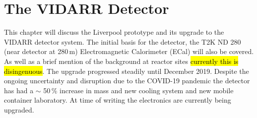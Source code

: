 
\ifpdf
    \graphicspath{{Chapter3/Figs/Raster/}{Chapter3/Figs/PDF/}{Chapter3/Figs/}}
\else
    \graphicspath{{Chapter3/Figs/Vector/}{Chapter3/Figs/}}
\fi


\chapter{The VIDARR Detector}\label{Chp:ThePrototypeDetector}
This chapter will discuss the Liverpool prototype and its upgrade to the VIDARR detector system. The initial basis for the detector, the T2K ND 280 (near detector at 280\,m) Electromagnetic Calorimeter (ECal) will also be covered. As well as a brief mention of the background at reactor sites \hl{currently this is disingenuous}. The upgrade progressed steadily until December 2019. Despite the ongoing uncertainty and disruption due to the COVID-19 pandemic the detector has had a $\sim$ 50\,\% increase in mass and new cooling system and new mobile container laboratory. At time of writing the electronics are currently being upgraded. 

